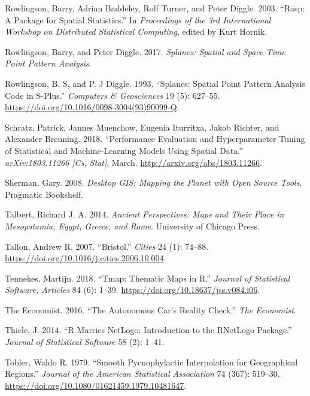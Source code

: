 \documentclass[]{krantz}
\begin{document}
\leavevmode\hypertarget{ref-rowlingson_rasp:_2003}{}%
Rowlingson, Barry, Adrian Baddeley, Rolf Turner, and Peter Diggle. 2003. ``Rasp: A Package for Spatial Statistics.'' In \emph{Proceedings of the 3rd International Workshop on Distributed Statistical Computing}, edited by Kurt Hornik.

\leavevmode\hypertarget{ref-rowlingson_splancs_2017}{}%
Rowlingson, Barry, and Peter Diggle. 2017. \emph{Splancs: Spatial and Space-Time Point Pattern Analysis}.

\leavevmode\hypertarget{ref-rowlingson_splancs_1993}{}%
Rowlingson, B. S, and P. J Diggle. 1993. ``Splancs: Spatial Point Pattern Analysis Code in S-Plus.'' \emph{Computers \& Geosciences} 19 (5): 627--55. \url{https://doi.org/10.1016/0098-3004(93)90099-Q}.

\leavevmode\hypertarget{ref-schratz_performance_nodate}{}%
Schratz, Patrick, Jannes Muenchow, Eugenia Iturritxa, Jakob Richter, and Alexander Brenning. 2018. ``Performance Evaluation and Hyperparameter Tuning of Statistical and Machine-Learning Models Using Spatial Data.'' \emph{arXiv:1803.11266 {[}Cs, Stat{]}}, March. \url{http://arxiv.org/abs/1803.11266}.

\leavevmode\hypertarget{ref-sherman_desktop_2008}{}%
Sherman, Gary. 2008. \emph{Desktop GIS: Mapping the Planet with Open Source Tools}. Pragmatic Bookshelf.

\leavevmode\hypertarget{ref-talbert_ancient_2014}{}%
Talbert, Richard J. A. 2014. \emph{Ancient Perspectives: Maps and Their Place in Mesopotamia, Egypt, Greece, and Rome}. University of Chicago Press.

\leavevmode\hypertarget{ref-tallon_bristol_2007}{}%
Tallon, Andrew R. 2007. ``Bristol.'' \emph{Cities} 24 (1): 74--88. \url{https://doi.org/10.1016/j.cities.2006.10.004}.

\leavevmode\hypertarget{ref-tennekes_tmap_2018}{}%
Tennekes, Martijn. 2018. ``Tmap: Thematic Maps in R.'' \emph{Journal of Statistical Software, Articles} 84 (6): 1--39. \url{https://doi.org/10.18637/jss.v084.i06}.

\leavevmode\hypertarget{ref-theeconomist_autonomous_2016}{}%
The Economist. 2016. ``The Autonomous Car's Reality Check.'' \emph{The Economist}.

\leavevmode\hypertarget{ref-thiele_r_2014}{}%
Thiele, J. 2014. ``R Marries NetLogo: Introduction to the RNetLogo Package.'' \emph{Journal of Statistical Software} 58 (2): 1--41.

\leavevmode\hypertarget{ref-tobler_smooth_1979}{}%
Tobler, Waldo R. 1979. ``Smooth Pycnophylactic Interpolation for Geographical Regions.'' \emph{Journal of the American Statistical Association} 74 (367): 519--30. \url{https://doi.org/10.1080/01621459.1979.10481647}.
\end{document}
